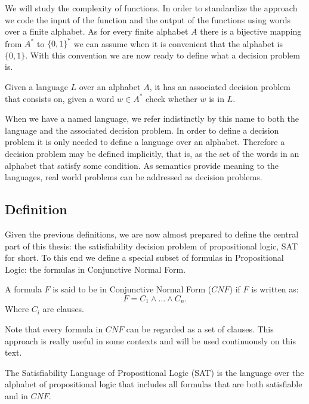 We will study the complexity of functions. In order to standardize the approach we code the input of the function and the output of the functions using words over a finite alphabet. As for every finite alphabet $A$ there is a bijective mapping from $A^*$ to $\{0,1\}^*$ we can assume when it is convenient that the alphabet is $\{0,1\}$. With this convention we are now ready to define what a decision problem is.

\begin{definition}
  Given a language $L$ over an alphabet $A$, it has an associated decision problem that consists on, given a word $w\in A^*$ check whether $w$ is in $L$. 	
\end{definition}


When we have a named language, we refer indistinctly by this name to both the language and the associated decision problem. In order to define a decision problem it is only needed to define a language over an alphabet. Therefore a decision problem may be defined implicitly, that is, as the set of the words in an alphabet that satisfy some condition. As semantics provide meaning to the languages, real world problems can be addressed as decision problems.


\subsection{Definition}

Given the previous definitions, we are now almost prepared to define the central part of this thesis: the satisfiability decision problem of propositional logic, SAT for short. To this end we define a special subset of formulas in Propositional Logic: the formulas in Conjunctive Normal Form.

\begin{definition}
  A formula $F$ is said to be in Conjunctive Normal Form ($CNF$) if $F$ is written as:
  $$F = C_1\wedge ... \wedge C_n.$$
  Where $C_i$  are clauses.
\end{definition}

Note that every formula in $CNF$ can be regarded as a set of clauses. This approach is really useful in some contexts and will be used continuously on this text.

\begin{definition}
  The Satisfiability Language of Propositional Logic (SAT) is the language over the alphabet of propositional logic that includes all formulas that are both satisfiable and in $CNF$.
\end{definition}

